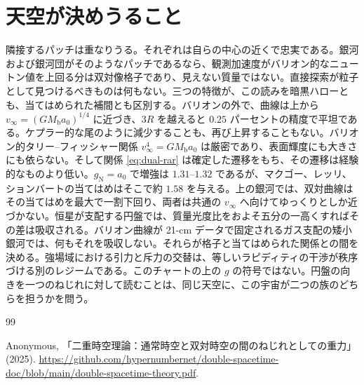 \documentclass[a4paper]{article}
\begin{document}
\section{天空が決めうること}
\label{sec:sky}

隣接するパッチは重なりうる。それぞれは自らの中心の近くで忠実である。銀河および銀河団がそのようなパッチであるなら、観測加速度がバリオン的なニュートン値を上回る分は双対像格子であり、見えない質量ではない。直接探索が粒子として見つけるべきものは何もない。三つの特徴が、この読みを暗黒ハローとも、当てはめられた補間とも区別する。バリオンの外で、曲線は上から $v_\infty=(GM_{\text{b}}a_0)^{1/4}$ に近づき、$3R$ を越えると $0.25$ パーセントの精度で平坦である。ケプラー的な尾のように減少することも、再び上昇することもない。バリオン的タリー--フィッシャー関係 $v_\infty^4=GM_{\text{b}}a_0$ は厳密であり、表面輝度にも大きさにも依らない。そして関係 \eqref{eq:dual-rar} は確定した遷移をもち、その遷移は経験的なものより低い。$g_{\text{N}}=a_0$ で増強は $1.31$--$1.32$ であるが、マクゴー、レッリ、ションバートの当てはめはそこで約 $1.58$ を与える。上の銀河では、双対曲線はその当てはめを最大で一割下回り、両者は共通の $v_\infty$ へ向けてゆっくりとしか近づかない。恒星が支配する円盤では、質量光度比をおよそ五分の一高くすればその差は吸収される。バリオン曲線が 21-cm データで固定されるガス支配の矮小銀河では、何もそれを吸収しない。それらが格子と当てはめられた関係との間を決める。強場域における引力と斥力の交替は、等しいラピディティの干渉が秩序づける別のレジームである。このチャートの上の $g$ の符号ではない。円盤の向きを一つのねじれに対して読むことは、同じ天空に、この宇宙が二つの族のどちらを担うかを問う。

\begin{thebibliography}{99}
\raggedright

Anonymous,
「二重時空理論：通常時空と双対時空の間のねじれとしての重力」 (2025).
\url{https://github.com/hypernumbernet/double-spacetime-doc/blob/main/double-spacetime-theory.pdf}.

\end{thebibliography}
\end{document}
